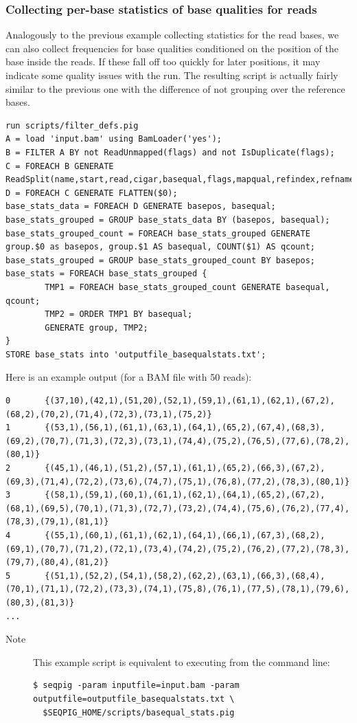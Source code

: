 \subsubsection{Collecting per-base statistics of base qualities for reads}
Analogously to the previous example collecting statistics for the read bases, we can also collect
frequencies for base qualities conditioned on the position of the base inside
the reads. If these fall off too quickly for later positions, it may
indicate some quality issues with the run. The resulting script is actually
fairly similar to the previous one with the difference of not grouping
over the reference bases.
\begin{lstlisting}
run scripts/filter_defs.pig
A = load 'input.bam' using BamLoader('yes');
B = FILTER A BY not ReadUnmapped(flags) and not IsDuplicate(flags);
C = FOREACH B GENERATE ReadSplit(name,start,read,cigar,basequal,flags,mapqual,refindex,refname,attributes#'MD');
D = FOREACH C GENERATE FLATTEN($0);
base_stats_data = FOREACH D GENERATE basepos, basequal;
base_stats_grouped = GROUP base_stats_data BY (basepos, basequal);
base_stats_grouped_count = FOREACH base_stats_grouped GENERATE group.$0 as basepos, group.$1 AS basequal, COUNT($1) AS qcount;
base_stats_grouped = GROUP base_stats_grouped_count BY basepos;
base_stats = FOREACH base_stats_grouped {
        TMP1 = FOREACH base_stats_grouped_count GENERATE basequal, qcount;
        TMP2 = ORDER TMP1 BY basequal;
        GENERATE group, TMP2;
}
STORE base_stats into 'outputfile_basequalstats.txt';
\end{lstlisting}
Here is an example output (for a BAM file with 50 reads):
\begin{lstlisting}
0       {(37,10),(42,1),(51,20),(52,1),(59,1),(61,1),(62,1),(67,2),(68,2),(70,2),(71,4),(72,3),(73,1),(75,2)}
1       {(53,1),(56,1),(61,1),(63,1),(64,1),(65,2),(67,4),(68,3),(69,2),(70,7),(71,3),(72,3),(73,1),(74,4),(75,2),(76,5),(77,6),(78,2),(80,1)}
2       {(45,1),(46,1),(51,2),(57,1),(61,1),(65,2),(66,3),(67,2),(69,3),(71,4),(72,2),(73,6),(74,7),(75,1),(76,8),(77,2),(78,3),(80,1)}
3       {(58,1),(59,1),(60,1),(61,1),(62,1),(64,1),(65,2),(67,2),(68,1),(69,5),(70,1),(71,3),(72,7),(73,2),(74,4),(75,6),(76,2),(77,4),(78,3),(79,1),(81,1)}
4       {(55,1),(60,1),(61,1),(62,1),(64,1),(66,1),(67,3),(68,2),(69,1),(70,7),(71,2),(72,1),(73,4),(74,2),(75,2),(76,2),(77,2),(78,3),(79,7),(80,4),(81,2)}
5       {(51,1),(52,2),(54,1),(58,2),(62,2),(63,1),(66,3),(68,4),(70,1),(71,1),(72,2),(73,3),(74,1),(75,8),(76,1),(77,5),(78,1),(79,6),(80,3),(81,3)}
...
\end{lstlisting}
\begin{description}
	\item[Note] This example script is equivalent to executing from the command line:
\begin{lstlisting}
$ seqpig -param inputfile=input.bam -param outputfile=outputfile_basequalstats.txt \
  $SEQPIG_HOME/scripts/basequal_stats.pig
\end{lstlisting}
\end{description}

